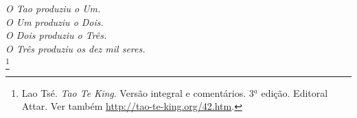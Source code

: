 \begin{dedicatoria}
   \vspace*{\fill}
   \vspace*{\fill}
   \vspace*{\fill}
   \vspace*{\fill}
   \vspace*{\fill}
   \vspace*{\fill}
   \vspace*{\fill}
   \vspace*{\fill}
   \vspace*{\fill}
   \vspace*{\fill}
   \vspace*{\fill}
   \vspace*{\fill}
   \vspace*{\fill}
   \vspace*{\fill}
   \vspace*{\fill}
   \centering \textit{O Tao produziu o Um.\\O Um produziu o Dois.\\O Dois produziu o Três.\\O Tr\^es produziu os dez mil seres.\\}\footnote{Lao Tsé. \emph{Tao Te King}. Versão integral e comentários. 3$^a$ edição. Editoral Attar. Ver também \url{http://tao-te-king.org/42.htm}.}
   \vspace*{\fill}
   \vspace*{\fill}
   \vspace*{\fill}
   \vspace*{\fill}
   \vspace*{\fill}
   \vspace*{\fill}
   \vspace*{\fill}
   \vspace*{\fill}
   \vspace*{\fill}
   \vspace*{\fill}
   \vspace*{\fill}
   \vspace*{\fill}
   \vspace*{\fill}
   \vspace*{\fill}
   \vspace*{\fill}
   \vspace*{\fill}
\end{dedicatoria}